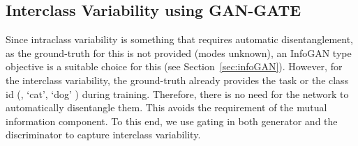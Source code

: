 \subsection{Interclass Variability using GAN-GATE}
\label{sec:interclass}
Since intraclass variability is something that requires automatic disentanglement, as the ground-truth for this is not provided (modes unknown), an InfoGAN type objective is a suitable choice for this (see Section~\ref{sec:infoGAN}). However, for the interclass variability, the ground-truth already provides the task or the class id (\eg, `cat', `dog' \etc) during training. Therefore, there is no need for the network to automatically disentangle them. This avoids the requirement of the mutual information component. To this end, we use gating in both generator and the discriminator to capture interclass variability. 

